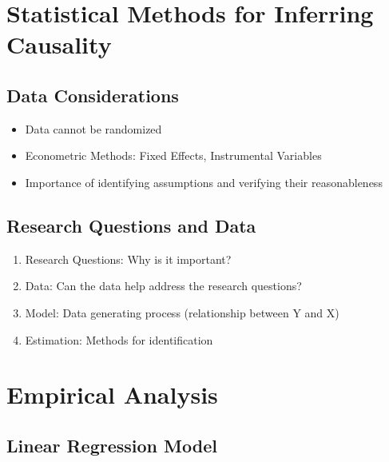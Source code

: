 \documentclass[
]{article}
\providecommand{\tightlist}{%
  \setlength{\itemsep}{0pt}\setlength{\parskip}{0pt}}
\begin{document}
\hypertarget{statistical-methods-for-inferring-causality}{%
\section{Statistical Methods for Inferring
Causality}\label{statistical-methods-for-inferring-causality}}

\hypertarget{data-considerations}{%
\subsection{Data Considerations}\label{data-considerations}}

\begin{itemize}
\tightlist
\item
  Data cannot be randomized
\item
  Econometric Methods: Fixed Effects, Instrumental Variables
\item
  Importance of identifying assumptions and verifying their
  reasonableness
\end{itemize}

\hypertarget{research-questions-and-data}{%
\subsection{Research Questions and
Data}\label{research-questions-and-data}}

\begin{enumerate}
\def\labelenumi{\arabic{enumi}.}
\tightlist
\item
  Research Questions: Why is it important?
\item
  Data: Can the data help address the research questions?
\item
  Model: Data generating process (relationship between Y and X)
\item
  Estimation: Methods for identification
\end{enumerate}

\hypertarget{empirical-analysis}{%
\section{Empirical Analysis}\label{empirical-analysis}}

\hypertarget{linear-regression-model}{%
\subsection{Linear Regression Model}\label{linear-regression-model}}
\end{document}
